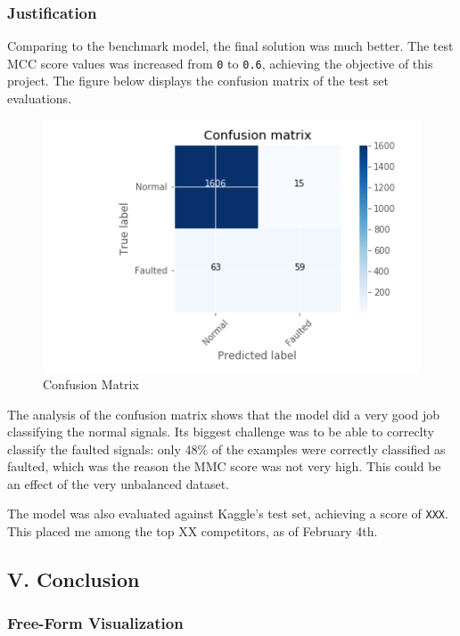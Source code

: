 \documentclass[11pt]{article}
\makeatletter
\def\maxwidth{\ifdim\Gin@nat@width>\linewidth\linewidth
    \else\Gin@nat@width\fi}
\let\Oldincludegraphics\includegraphics
\renewcommand{\includegraphics}[1]{\Oldincludegraphics[width=.8\maxwidth]{#1}}
\makeatother
\begin{document}
\hypertarget{justification}{%
\subsubsection{Justification}\label{justification}}

Comparing to the benchmark model, the final solution was much better.
The test MCC score values was increased from \texttt{0} to \texttt{0.6},
achieving the objective of this project. The figure below displays the
confusion matrix of the test set evaluations.

\begin{figure}
\centering
\includegraphics{cnf_matrix_testset.png}
\caption{Confusion Matrix}
\end{figure}

The analysis of the confusion matrix shows that the model did a very
good job classifying the normal signals. Its biggest challenge was to be
able to correclty classify the faulted signals: only 48\% of the
examples were correctly classified as faulted, which was the reason the
MMC score was not very high. This could be an effect of the very
unbalanced dataset.

The model was also evaluated against Kaggle's test set, achieving a
score of \texttt{XXX}. This placed me among the top XX competitors, as
of February 4th.

    \hypertarget{v.-conclusion}{%
\subsection{V. Conclusion}\label{v.-conclusion}}

\hypertarget{free-form-visualization}{%
\subsubsection{Free-Form Visualization}\label{free-form-visualization}}
\end{document}
